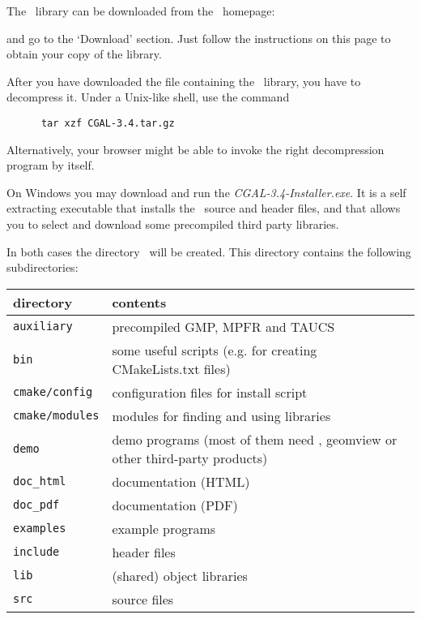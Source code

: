 The \cgal\ library can be downloaded from the \cgal\
homepage:
\begin{quote}
      \cgalhomepage
\end{quote}
and go to the `Download' section. Just follow the instructions on this
page to obtain your copy of the library.

After you have downloaded the file containing the \cgal\ library, you
have to decompress it. Under a Unix-like shell, use the command

\begin{verbatim}
      tar xzf CGAL-3.4.tar.gz
\end{verbatim}

Alternatively, your browser might be able to invoke the right
decompression program by itself.

On Windows you may download and run the {\em CGAL-3.4-Installer.exe}. It is a
self extracting executable that installs the \cgal\ source and header
files, and that allows you to select and download some precompiled
third party libraries.

In both cases the directory \cgaldir\ will be created. This directory
contains the following subdirectories:\index{directories!structure}

\begin{center}
  \renewcommand{\arraystretch}{1.3}
  \gdef\lcTabularBorder{2}
  \begin{tabular}{|l|l|} \hline
    \textbf{directory} & \textbf{contents}\\\hline\hline
    \texttt{auxiliary} & precompiled GMP, MPFR and TAUCS\\\hline
    \texttt{bin}       & some useful scripts (e.g. for creating CMakeLists.txt files)\\\hline
    \texttt{cmake/config}    & configuration files for install script\\\hline
    \texttt{cmake/modules}    & modules for finding and using libraries\\\hline
    \texttt{demo}      & demo programs (most of them need \qt, geomview
                         or other third-party products)\\\hline
    \texttt{doc\_html} & documentation (HTML)\\\hline
    \texttt{doc\_pdf}  & documentation (PDF)\\\hline
    \texttt{examples}  & example programs\\\hline
    \texttt{include}   & header files\\\hline
    \texttt{lib}       & (shared) object libraries\\\hline
    \texttt{src}       & source files\\\hline
  \end{tabular}
\end{center}

